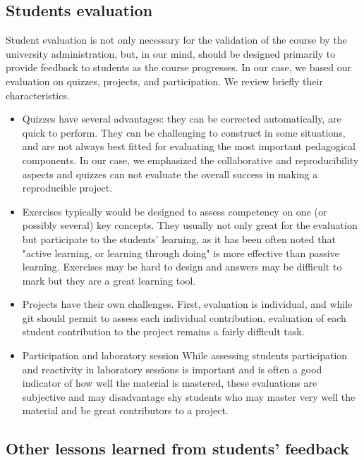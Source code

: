 \subsection*{Students evaluation}
Student evaluation is not only necessary for the validation of the course by
the university administration, but, in our mind, should be designed primarily
to provide feedback to students as the course progresses. In our case, we based
our evaluation on quizzes, projects, and participation. We review briefly their
characteristics.
\begin{itemize}

\item Quizzes have several advantages: they can be corrected automatically, are
quick to perform. They can be challenging to construct in some situations, and
are not always best fitted for evaluating the most important pedagogical
components. In our case, we emphasized the collaborative and reproducibility
aspects and quizzes can not evaluate the overall success in making a
reproducible project.

\item Exercises typically would be designed to assess competency on one (or
possibly several) key concepts. They usually not only great for the evaluation
but participate to the students' learning, as it has been often noted that
"active learning, or learning through doing" is more effective than passive
learning. Exercises may be hard to design and answers may be difficult to mark
but they are a great learning tool. 

\item Projects have their own challenges. First, evaluation is
individual, and while git should permit to assess each individual contribution,
evaluation of each student contribution to the project remains a fairly
difficult task. 

\item Participation and laboratory session
While assessing students participation and reactivity in laboratory sessions is
important and is often a good indicator of how well the material is mastered,
these evaluations are subjective and may disadvantage shy students who may
master very well the material and be great contributors to a project.  

\end{itemize}

\subsection*{Other lessons learned from students' feedback}

